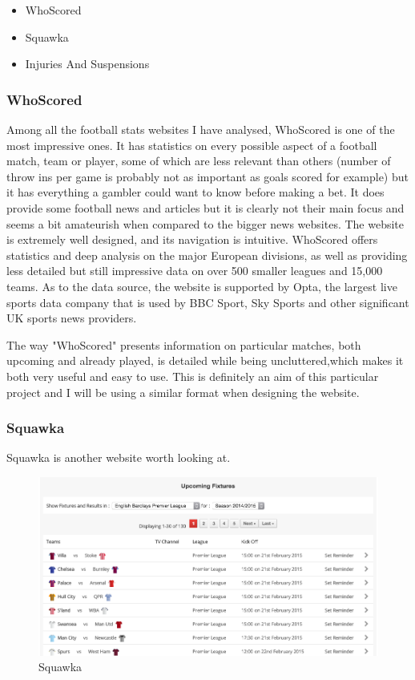 \begin{itemize}
	\item WhoScored \citep{source:whoscored} 
	\item Squawka  \citep{source:squawka}
	\item Injuries And Suspensions \citep{source:injuriesandsuspensions}
\end{itemize}

\subsubsection{WhoScored}
\label{subsubsec:whoscored_req}
Among all the football stats websites I have analysed, WhoScored is one of the most impressive ones. It has statistics on every possible aspect of a football match, team or player, some of which are less relevant than others (number of throw ins per game is probably not as important as goals scored for example) but it has everything a gambler could want to know before making a bet. It does provide some football news and articles but it is clearly not their main focus and seems a bit amateurish when compared to the bigger news websites.
The website is extremely well designed, and its navigation is intuitive. WhoScored offers statistics and deep analysis on the major European divisions, as well as providing less detailed but still impressive data on over 500 smaller leagues and 15,000 teams. As to the data source, the website is supported by Opta, the largest live sports data company that is used by BBC Sport, Sky Sports and other significant UK sports news providers. 

The way "WhoScored" presents information on particular matches, both upcoming and already played, is detailed while being uncluttered,which makes it both very useful and easy to use. This is definitely an aim of this particular project and I will be using a similar format when designing the website.

\subsubsection{Squawka}
\label{subsubsec:squawka_req}	
Squawka is another website worth looking at.
		
\begin{figure}[H]
	\begin{center}
		\includegraphics[width=.80\linewidth,natwidth=610,natheight=642]{req/images/squawka.png}
		\caption{Squawka} \label{fig:using:squawka}
	\end{center}
\end{figure}
	
